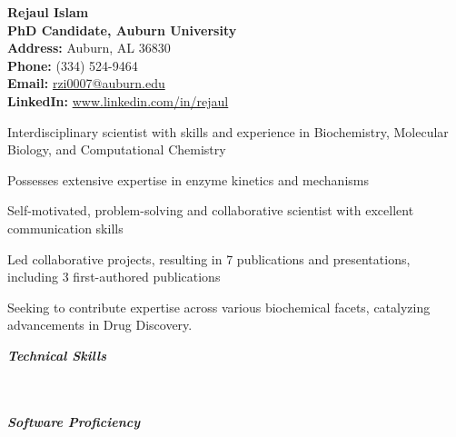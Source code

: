 \documentclass[10pt]{article}
\begin{document}
\begin{multicols}{2}
    \raggedright
    \textbf{\LARGE Rejaul Islam}\\
    \normalsize{\textbf{PhD Candidate, Auburn University}}\\[1ex]
    \columnbreak
    \raggedleft
    \textbf{Address:} Auburn, AL 36830\\
    \textbf{Phone:} (334) 524-9464\\
    \textbf{Email:} \href{mailto:rzi0007@auburn.edu}{rzi0007@auburn.edu}\\
    \textbf{LinkedIn:} \href{http://www.linkedin.com/in/rejaul}{www.linkedin.com/in/rejaul}
\end{multicols}

\spacedhrule{-1.0ex}{-0.5ex}
\vspace{-1.0ex}
\begin{circlist}
    \item Interdisciplinary scientist with skills and experience in Biochemistry, Molecular Biology, and Computational Chemistry
    \item Possesses extensive expertise in enzyme kinetics and mechanisms
    \item Self-motivated, problem-solving and collaborative scientist with excellent communication skills
    \item Led collaborative projects, resulting in 7 publications and presentations, including 3 first-authored publications
    \item Seeking to contribute expertise across various biochemical facets, catalyzing advancements in Drug Discovery.
\end{circlist}

\spacedhrule{0.8ex}{0.0ex}

\textbf{\textit{Technical Skills}}

\begin{indentsection}
    \\
    \\
    \textbf{\textit{Software Proficiency}}
\end{indentsection}
\end{document}
